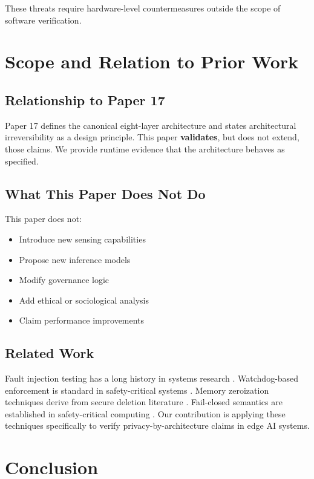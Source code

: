 \documentclass[conference]{IEEEtran}
\begin{document}
These threats require hardware-level countermeasures outside the scope of software verification.

\section{Scope and Relation to Prior Work}

\subsection{Relationship to Paper 17}
Paper 17 \cite{b17} defines the canonical eight-layer architecture and states architectural irreversibility as a design principle. This paper \textbf{validates}, but does not extend, those claims. We provide runtime evidence that the architecture behaves as specified.

\subsection{What This Paper Does Not Do}
This paper does not:
\begin{itemize}
    \item Introduce new sensing capabilities
    \item Propose new inference models
    \item Modify governance logic
    \item Add ethical or sociological analysis
    \item Claim performance improvements
\end{itemize}

\subsection{Related Work}
Fault injection testing has a long history in systems research \cite{b1, b2}. Watchdog-based enforcement is standard in safety-critical systems \cite{b3}. Memory zeroization techniques derive from secure deletion literature \cite{b4}. Fail-closed semantics are established in safety-critical computing \cite{b5}. Our contribution is applying these techniques specifically to verify privacy-by-architecture claims in edge AI systems.

\section{Conclusion}
\end{document}
